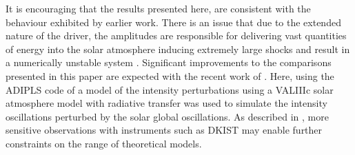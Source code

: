 \documentclass[physics,article,submit,pdftex,moreauthors]{Definitions/mdpi}
\begin{document}
It is encouraging that the results presented here, are consistent with the behaviour exhibited by earlier work. There is an issue that due to the extended nature of the driver, the amplitudes are responsible for delivering vast quantities of energy into the solar atmosphere inducing extremely large shocks and result in a numerically unstable system \cite{Santamaria2015}. Significant improvements to the comparisons presented in this paper are expected with the  recent work of \cite{Kostogryz2021}. Here, using the ADIPLS code of \cite{Christensen-Dalsgaard2008} a model of the intensity perturbations using a VALIIIc solar atmosphere model with radiative transfer was used to simulate the intensity oscillations perturbed by the solar global oscillations. As described in \cite{Rast2016}, more sensitive observations with instruments such as DKIST may enable further constraints on the range of theoretical models. 








\end{document}
